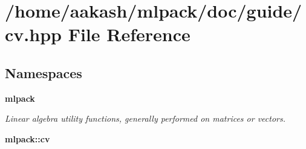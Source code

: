 \section{/home/aakash/mlpack/doc/guide/cv.hpp File Reference}
\label{cv_8hpp}
\subsection*{Namespaces}
\begin{DoxyCompactItemize}
\item 
 \textbf{ mlpack}
\begin{DoxyCompactList}\small\item\em Linear algebra utility functions, generally performed on matrices or vectors. \end{DoxyCompactList}\item 
 \textbf{ mlpack\+::cv}
\end{DoxyCompactItemize}

